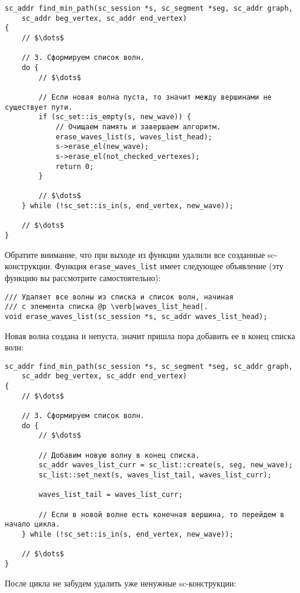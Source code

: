 \begin{lstlisting}[texcl]
sc_addr find_min_path(sc_session *s, sc_segment *seg, sc_addr graph,
    sc_addr beg_vertex, sc_addr end_vertex)
{
    // $\dots$

    // 3. Сформируем список волн.
    do {
        // $\dots$

        // Если новая волна пуста, то значит между вершинами не существует пути.
        if (sc_set::is_empty(s, new_wave)) {
            // Очищаем память и завершаем алгоритм.
            erase_waves_list(s, waves_list_head);
            s->erase_el(new_wave);
            s->erase_el(not_checked_vertexes);
            return 0;
        }

        // $\dots$
    } while (!sc_set::is_in(s, end_vertex, new_wave));

    // $\dots$
}
\end{lstlisting}

Обратите внимание, что при выходе из функции удалили все созданные
sc-конструкции. Функция \lstinline|erase_waves_list| имеет следующее
объявление (эту функцию вы рассмотрите самостоятельно):

\begin{lstlisting}[texcl]
/// Удаляет все волны из списка и список волн, начиная
/// с элемента списка @p \verb|waves_list_head|.
void erase_waves_list(sc_session *s, sc_addr waves_list_head);
\end{lstlisting}

Новая волна создана и непуста, значит пришла пора добавить ее в конец
списка волн:

\begin{lstlisting}[texcl]
sc_addr find_min_path(sc_session *s, sc_segment *seg, sc_addr graph,
    sc_addr beg_vertex, sc_addr end_vertex)
{
    // $\dots$

    // 3. Сформируем список волн.
    do {
        // $\dots$

        // Добавим новую волну в конец списка.
        sc_addr waves_list_curr = sc_list::create(s, seg, new_wave);
        sc_list::set_next(s, waves_list_tail, waves_list_curr);

        waves_list_tail = waves_list_curr;

        // Если в новой волне есть конечная вершина, то перейдем в начало цикла.
    } while (!sc_set::is_in(s, end_vertex, new_wave));

    // $\dots$
}
\end{lstlisting}

После цикла не забудем удалить уже ненужные sc-конструкции:

